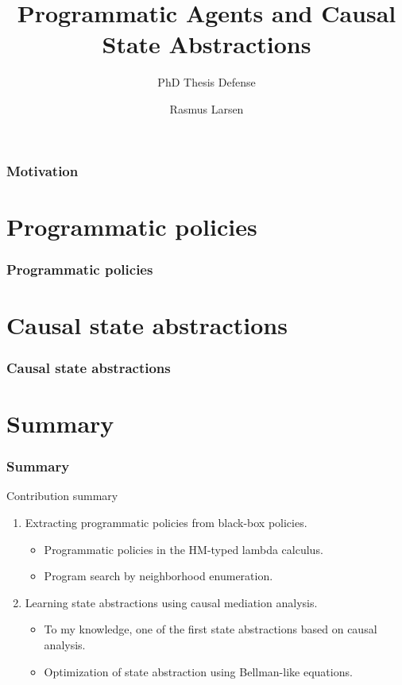 \documentclass[aspectratio=169, hyperref={pdfpagelabels=false}]{beamer}
\subtitle{PhD Thesis Defense}
\title{Programmatic Agents and Causal State Abstractions}
\author{Rasmus Larsen}
\begin{document}
\inserttitlepage




\section{Motivation}


\part{Programmatic policies}
\frame[noframenumbering]{\centering\partpage\strut}
\section{Programmatic policies}


\part{Causal state abstractions}
\frame[noframenumbering]{\centering\partpage\strut}
\section{Causal state abstractions}


\part{Summary}
\frame[noframenumbering]{\centering\partpage\strut}
\section{Summary}
\begin{frame}{Contribution summary}
    \begin{enumerate}
        \item Extracting programmatic policies from black-box policies.
        \begin{itemize}
            \item Programmatic policies in the HM-typed lambda calculus.
            \item Program search by neighborhood enumeration.
        \end{itemize}
        \item Learning state abstractions using causal mediation analysis.
        \begin{itemize}
            \item To my knowledge, one of the first state abstractions based on causal analysis.
            \item Optimization of state abstraction using Bellman-like equations.
        \end{itemize}
    \end{enumerate}
\end{frame}
\end{document}
